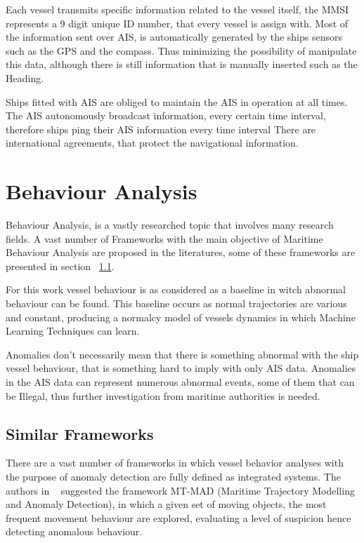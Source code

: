 Each vessel transmits specific information related to the vessel itself, the MMSI represents a 9 digit unique ID number, that every vessel is assign with.
Most of the information sent over AIS, is automatically generated by the ships sensors such as the GPS and the compass. Thus minimizing the possibility of manipulate this data, although there is still information that is manually inserted such as the Heading.

Ships fitted with AIS are obliged to maintain the AIS in operation at all times. The AIS autonomously broadcast information, every certain time interval, therefore ships ping their AIS information every time interval   There are international agreements, that protect the navigational information.


\section{Behaviour Analysis}
Behaviour Analysis, is a vastly researched topic that involves many research fields. A vast number of Frameworks with the main objective of Maritime Behaviour Analysis are proposed in the literatures, some of these frameworks are presented in section ~\ref{section: Similar Frameworks}.

For this work vessel behaviour is as considered as a baseline in witch abnormal behaviour can be found. This baseline occurs as normal trajectories are various and constant, producing a normalcy model of vessels dynamics in which Machine Learning Techniques can learn.

Anomalies don't necessarily mean that there is something abnormal with the ship vessel behaviour, that is something hard to imply with only AIS data. Anomalies in the AIS data can represent numerous abnormal events, some of them that can be Illegal, thus further investigation from maritime authorities is needed. 

\subsection{Similar Frameworks}
\label{section: Similar Frameworks}

There are a vast number of frameworks in which vessel behavior analyses with the purpose of anomaly detection are fully defined as integrated systems. The authors in ~\cite{Lei2016} suggested the framework MT-MAD (Maritime Trajectory Modelling and Anomaly Detection), in which a given set of moving objects, the most frequent movement behaviour are explored, evaluating a level of suspicion hence detecting anomalous behaviour.

